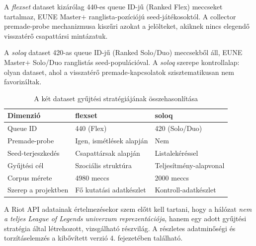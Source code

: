 A \textit{flexset} dataset kizárólag 440-es queue ID-jű (Ranked Flex) meccseket tartalmaz, EUNE Master$+$ ranglista-pozíciójú seed-játékosoktól. A collector premade-probe mechanizmusa kiszűri azokat a jelölteket, akiknek nincs elegendő visszatérő csapattársi mintázatuk.

A \textit{soloq} dataset 420-as queue ID-jű (Ranked Solo/Duo) meccsekből áll, EUNE Master$+$ Solo/Duo ranglistás seed-populációval. A \textit{soloq} szerepe kontrollalap: olyan dataset, ahol a visszatérő premade-kapcsolatok szisztematikusan nem favorizáltak.

\begin{table}[H]
\centering
\caption{A két dataset gyűjtési stratégiájának összehasonlítása}
\begin{tabularx}{\textwidth}{>{\raggedright\arraybackslash}p{4.2cm}|X|X}
\toprule
\textbf{Dimenzió} & \textbf{flexset} & \textbf{soloq} \\
\midrule
Queue ID & 440 (Flex) & 420 (Solo/Duo) \\
Premade-probe & Igen, ismétlések alapján & Nem \\
Seed-terjeszkedés & Csapattársak alapján & Listalekéréssel \\
Gyűjtési cél & Szociális struktúra & Teljesítmény-alapvonal \\
Corpus mérete & 4980 meccs & 2000 meccs \\
Szerep a projektben & Fő kutatási adatkészlet & Kontroll-adatkészlet \\
\bottomrule
\end{tabularx}
\end{table}

A Riot API adatainak értelmezésekor szem előtt kell tartani, hogy a hálózat \emph{nem a teljes League of Legends univerzum reprezentációja}, hanem egy adott gyűjtési stratégia által létrehozott, vizsgálható részvilág. A részletes adatminőségi és torzításelemzés a kibővített verzió 4. fejezetében található.
